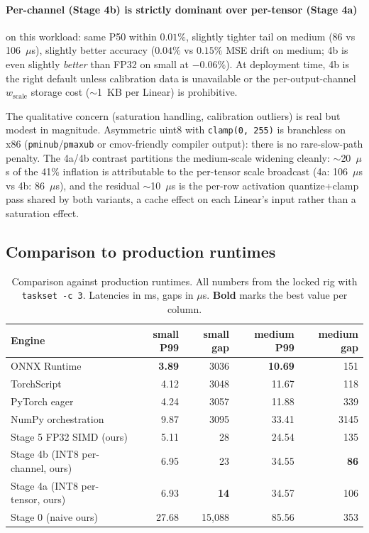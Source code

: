 \documentclass{article}
\begin{document}
\paragraph{Per-channel (Stage 4b) is strictly dominant over per-tensor (Stage 4a)} on this workload: same P50 within $0.01\%$, slightly tighter tail on medium (86 vs 106~$\mu$s), slightly better accuracy ($0.04\%$ vs $0.15\%$ MSE drift on medium; 4b is even slightly \emph{better} than FP32 on small at $-0.06\%$).
At deployment time, 4b is the right default unless calibration data is unavailable or the per-output-channel $w_\text{scale}$ storage cost ($\sim$1~KB per Linear) is prohibitive.

The qualitative concern (saturation handling, calibration outliers) is real but modest in magnitude.
Asymmetric uint8 with \texttt{clamp(0, 255)} is branchless on x86 (\texttt{pminub}/\texttt{pmaxub} or cmov-friendly compiler output): there is no rare-slow-path penalty.
The 4a/4b contrast partitions the medium-scale widening cleanly: $\sim$20~$\mu$s of the 41\% inflation is attributable to the per-tensor scale broadcast (4a: 106~$\mu$s vs 4b: 86~$\mu$s), and the residual $\sim$10~$\mu$s is the per-row activation quantize+clamp pass shared by both variants, a cache effect on each Linear's input rather than a saturation effect.

\subsection{Comparison to production runtimes}
\label{sec:prod}

\begin{table}[t]
\centering
\caption{Comparison against production runtimes. All numbers from the locked rig with \texttt{taskset -c 3}. Latencies in ms, gaps in $\mu$s. \textbf{Bold} marks the best value per column.}
\label{tab:prod}
\small
\begin{tabular}{lrrrr}
\toprule
Engine & small P99 & small gap & medium P99 & medium gap \\
\midrule
ONNX Runtime                       & \textbf{3.89} & 3036 & \textbf{10.69} & 151 \\
TorchScript                        & 4.12          & 3048 & 11.67          & 118 \\
PyTorch eager                      & 4.24          & 3057 & 11.88          & 339 \\
NumPy orchestration                & 9.87          & 3095 & 33.41          & 3145 \\
Stage 5 FP32 SIMD (ours)           & 5.11          & 28   & 24.54          & 135 \\
Stage 4b (INT8 per-channel, ours)  & 6.95          & 23   & 34.55          & \textbf{86} \\
Stage 4a (INT8 per-tensor, ours)   & 6.93          & \textbf{14} & 34.57    & 106 \\
Stage 0 (naive ours)               & 27.68         & 15{,}088 & 85.56      & 353 \\
\bottomrule
\end{tabular}
\end{table}
\end{document}
